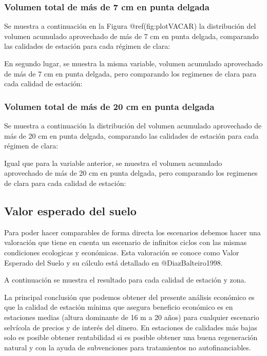 \documentclass[
]{article}
\begin{document}
\hypertarget{volumen-total-de-muxe1s-de-7-cm-en-punta-delgada}{%
\subsubsection{Volumen total de más de 7 cm en punta
delgada}\label{volumen-total-de-muxe1s-de-7-cm-en-punta-delgada}}

Se muestra a continuación en la Figura @ref(fig:plotVACAR) la
distribución del volumen acumulado aprovechado de más de 7 cm en punta
delgada, comparando las calidades de estación para cada régimen de
clara:

En segundo lugar, se muestra la misma variable, volumen acumulado
aprovechado de más de 7 cm en punta delgada, pero comparando los
regimenes de clara para cada calidad de estación:

\hypertarget{volumen-total-de-muxe1s-de-20-cm-en-punta-delgada}{%
\subsubsection{Volumen total de más de 20 cm en punta
delgada}\label{volumen-total-de-muxe1s-de-20-cm-en-punta-delgada}}

Se muestra a continuación la distribución del volumen acumulado
aprovechado de más de 20 cm en punta delgada, comparando las calidades
de estación para cada régimen de clara:

Igual que para la variable anterior, se muestra el volumen acumulado
aprovechado de más de 20 cm en punta delgada, pero comparando los
regimenes de clara para cada calidad de estación:

\hypertarget{valor-esperado-del-suelo}{%
\subsection{Valor esperado del suelo}\label{valor-esperado-del-suelo}}

Para poder hacer comparables de forma directa los escenarios debemos
hacer una valoración que tiene en cuenta un escenario de infinitos
ciclos con las mismas condiciones ecologicas y económicas. Esta
valoración se conoce como Valor Esperado del Suelo y su cálculo está
detallado en @DiazBalteiro1998.

A continuación se muestra el resultado para cada calidad de estación y
zona.

La principal conclusión que podemos obtener del presente análisis
económico es que la calidad de estación mínima que asegura beneficio
económico es en estaciones medias (altura dominante de 16 m a 20 años)
para cualquier escenario selvícola de precios y de interés del dinero.
En estaciones de calidades más bajas solo es posible obtener
rentabilidad si es posible obtener una buena regeneración natural y con
la ayuda de subvenciones para tratamientos no autofinanciables.
\end{document}
